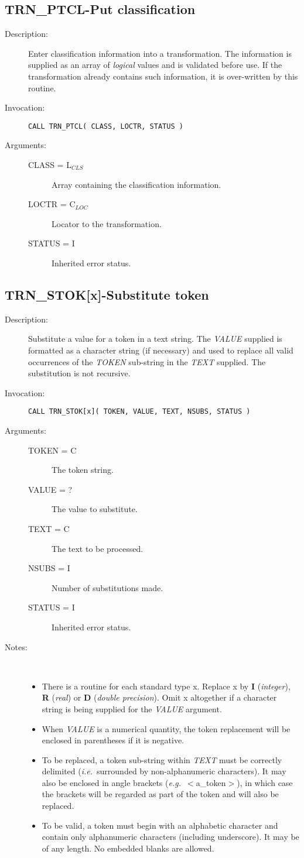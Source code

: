 \documentclass[twoside,11pt]{article}
\newcommand{\xlabel}[1]{}
\newcommand{\name}[1]{\mbox{\small{#1}}}
\newcommand{\fortvar}[1]{\mbox{\emph{#1}}}
\newlength{\sstbannerlength}
\newlength{\sstcaptionlength}
\newlength{\sstexampleslength}
\newlength{\sstexampleswidth}
\newcommand{\sstroutine}[3]{
   \goodbreak
   \rule{\textwidth}{0.5mm}
   \vspace{-7ex}
   \newline
   \settowidth{\sstbannerlength}{{\Large {\bf #1}}}
   \setlength{\sstcaptionlength}{\textwidth}
   \setlength{\sstexampleslength}{\textwidth}
   \addtolength{\sstbannerlength}{0.5em}
   \addtolength{\sstcaptionlength}{-2.0\sstbannerlength}
   \addtolength{\sstcaptionlength}{-5.0pt}
   \settowidth{\sstexampleswidth}{{\bf Examples:}}
   \addtolength{\sstexampleslength}{-\sstexampleswidth}
   \parbox[t]{\sstbannerlength}{\flushleft{\Large {\bf #1}}}
   \parbox[t]{\sstcaptionlength}{\center{\Large #2}}
   \parbox[t]{\sstbannerlength}{\flushright{\Large {\bf #1}}}
   \begin{description}
      #3
   \end{description}
}
\newcommand{\sstdescription}[1]{\item[Description:] #1}
\newcommand{\sstinvocation}[1]{\item[Invocation:]\hspace{0.4em}{\tt #1}}
\newcommand{\sstarguments}[1]{
   \item[Arguments:] \mbox{} \\
   \vspace{-3.5ex}
   \begin{description}
      #1
   \end{description}
}
\newcommand{\sstsubsection}[1]{ \item[{#1}] \mbox{} \\}
\newcommand{\sstnotes}[1]{\item[Notes:] \mbox{} \\[1.3ex] #1}
\newcommand{\sstitemlist}[1]{
  \mbox{} \\
  \vspace{-3.5ex}
  \begin{itemize}
     #1
  \end{itemize}
}
\newcommand{\sstitem}{\item}
\newcommand{\ssttt}{\tt}
\renewcommand{\sstroutine}[3]{
      \subsection{#1\xlabel{#1}-\label{#1}#2}
      \begin{description}
         #3
      \end{description}
   }
\renewcommand{\sstdescription}[1]{\item[Description:]
      \begin{description}
         #1
      \end{description}
   }
\renewcommand{\sstinvocation}[1]{\item[Invocation:]
      \begin{description}
         {\ssttt #1}
      \end{description}
   }
\renewcommand{\sstarguments}[1]{
      \item[Arguments:]
      \begin{description}
         #1
      \end{description}
   }
\renewcommand{\sstsubsection}[1]{\item[{#1}]}
\renewcommand{\sstnotes}[1]{\item[Notes:]
      \begin{description}
         #1
      \end{description}
   }
\newcommand{\sstitemlist}[1]{
      \begin{itemize}
         #1
      \end{itemize}
   }
\begin{document}
\sstroutine{TRN\_PTCL}{Put classification}
{
   \sstdescription{
       Enter classification information into a transformation.  The 
       information is supplied as an array of \emph{logical} values and 
       is validated before use.  If the transformation already contains 
       such information, it is over-written by this routine.
   } 
   \sstinvocation{CALL TRN\_PTCL( CLASS, LOCTR, STATUS )}
   \sstarguments{
      \sstsubsection{CLASS = L$_{CLS}$}{
         Array containing the classification information.}
      \sstsubsection{LOCTR = C$_{LOC}$}{
         Locator to the transformation.}
      \sstsubsection{STATUS = I}{
         Inherited error status.}
   }
}

\sstroutine{TRN\_STOK[x]}{Substitute token}
{
   \sstdescription{
       Substitute a value for a token in a text string.
       The \fortvar{VALUE} supplied is formatted as a character string
       (if necessary) and used to replace all valid occurrences of the
       \fortvar{TOKEN} sub-string in the \fortvar{TEXT} supplied.
       The substitution is not recursive.
   }
   \sstinvocation{CALL TRN\_STOK[x]( TOKEN, VALUE, TEXT, NSUBS, STATUS )}
   \sstarguments{
      \sstsubsection{TOKEN = C}{The token string.}
      \sstsubsection{VALUE = ?}{The value to substitute.}
      \sstsubsection{TEXT = C}{The text to be processed.}
      \sstsubsection{NSUBS = I}{Number of substitutions made.}
      \sstsubsection{STATUS = I}{Inherited error status.}
   }
   \sstnotes{
      \sstitemlist{
         \sstitem 
         There is a routine for each standard type x.
         Replace x by \textbf{I} (\emph{integer}), \textbf{R} (\emph{real}) 
         or \textbf{D} (\emph{double precision}).
         Omit x altogether if a character string is being supplied for the 
         \fortvar{VALUE} argument.

         \sstitem 
         When \fortvar{VALUE} is a numerical quantity, the token replacement
         will be enclosed in parentheses if it is negative.

         \sstitem 
         To be replaced, a token sub-string within \fortvar{TEXT} must be
         correctly delimited (\emph{i.e.}\ surrounded by non-alphanumeric
         characters).
         It may also be enclosed in angle brackets (\emph{e.g.}\
         \name{$<$a\_token$>$}), in which case the brackets will be regarded
         as part of the token and will also be replaced. 

         \sstitem
         To be valid, a token must begin with an alphabetic character and
         contain only alphanumeric characters (including underscore).
         It may be of any length.
         No embedded blanks are allowed. 
      }
   }
}
\end{document}

